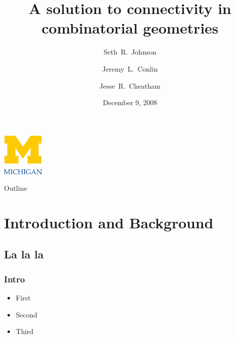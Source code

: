 \documentclass{beamer}
\title[MCGeometry]%
{A solution to connectivity in combinatorial geometries}
\author[SRJ, JLC, JRC]{Seth~R.~Johnson \and Jeremy~L.~Conlin \and Jesse~R.~Cheatham}
\institute[UM]{
University of Michigan, Ann Arbor
}
\date[Project presentation]{December 9, 2008}
\begin{document}

\begin{frame}
\titlepage
\begin{center}
  \includegraphics[width=2cm]{umlogo}
\end{center}
\end{frame}

\begin{frame}{Outline}
\tableofcontents
\end{frame}

\section{Introduction and Background}
\subsection{La la la}
\begin{frame}
  \frametitle{Intro}
  \begin{itemize}
  \item First
  \item Second
  \item Third
\end{itemize}
\end{frame}

\end{document}
